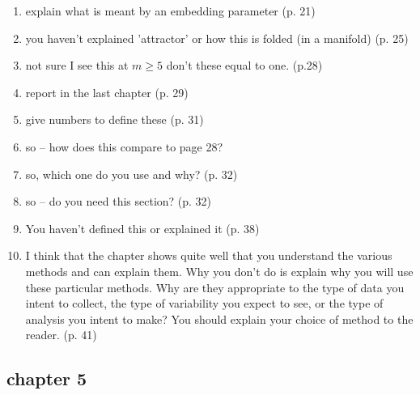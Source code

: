 \documentclass[10pt]{article}
\begin{document}
\begin{enumerate}[noitemsep,topsep=0pt]
\item explain what is meant by an embedding parameter (p. 21)
\item you haven't explained 'attractor' or how this is folded
	(in a manifold) (p. 25)

\item not sure I see this at $m \geq 5$ don't these equal to one. (p.28)

 
\item report in the last chapter (p. 29) 

\item give numbers to define these (p. 31)

\item so -- how does this compare to page 28? 
	
\item so, which one do you use and why? (p. 32)

\item so -- do you need this section?  (p. 32)

\item You haven't defined this or explained it (p. 38)

\item I think that the chapter shows quite well that you understand the various
	methods and can explain them.
	Why you don't do is explain why you will use these particular methods.
	Why are they appropriate to the type of data you intent 
	to collect, the type of variability you expect to see, 
	or the type of analysis you intent to make?
	You should explain your choice of method to the reader. (p. 41)
	
\end{enumerate}









\subsection{chapter 5}
\end{document}
